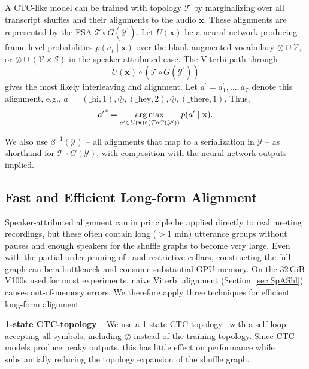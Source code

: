 
A CTC-like model can be trained with topology $\mathcal{T}$ by marginalizing over all transcript shuffles and their alignments to the audio $\mathbf{x}$. These alignments are represented by the FSA $\mathcal{T}\circ G(\mathcal{Y}^\prime)$. Let $U(\mathbf{x})$ be a neural network producing frame-level probabilities $p(a_t\mid\mathbf{x})$ over the blank-augmented vocabulary ${\oslash}\cup\mathcal{V}$, or ${\oslash}\cup(\mathcal{V}\times\mathcal{S})$ in the speaker-attributed case. The Viterbi path through
\begin{equation}
U(\mathbf{x})\circ\left(\mathcal{T}\circ G(\mathcal{Y}^\prime)\right)
\end{equation}
gives the most likely interleaving and alignment. Let $a^\prime=a_1^\prime,\ldots,a_T^\prime$ denote this alignment, e.g., $a^\prime=(\_\mbox{hi},1),\oslash,(\_\mbox{hey},2),\oslash,(\_\mbox{there},1).$
Thus,
\begin{equation}
{a^\prime}^*=
\operatorname*{arg\,max}_{a^\prime\in U(\mathbf{x})\circ\left(\mathcal{T}\circ G(\mathcal{Y}^\prime)\right)}
p(a^\prime\mid\mathbf{x}).
\label{eq:alignment}
\end{equation}

We also use $\beta^{-1}(\mathcal{Y})$ -- all alignments that map to a serialization in $\mathcal{Y}$ -- as shorthand for $\mathcal{T}\circ G(\mathcal{Y})$, with composition with the neural-network outputs implied.

\subsection{Fast and Efficient Long-form Alignment}
\label{sec:longform_tricks}
Speaker-attributed alignment can in principle be applied directly to real meeting recordings, but these often contain long ($>1$ min) utterance groups without pauses and enough speakers for the shuffle graphs to become very large. Even with the partial-order pruning of~\cite{wiesner2026modeling} and restrictive collars, constructing the full graph can be a bottleneck and consume substantial GPU memory. On the 32\,GiB V100s used for most experiments, naive Viterbi alignment (Section~\ref{sec:SpAShl}) causes out-of-memory errors. We therefore apply three techniques for efficient long-form alignment.


\textbf{1-state CTC-topology} -- We use a 1-state CTC topology~\cite{laptev2022ctc} with a self-loop accepting all symbols, including $\oslash$ instead of the training topology. Since CTC models produce peaky outputs, this has little effect on performance while substantially reducing the topology expansion of the shuffle graph.


